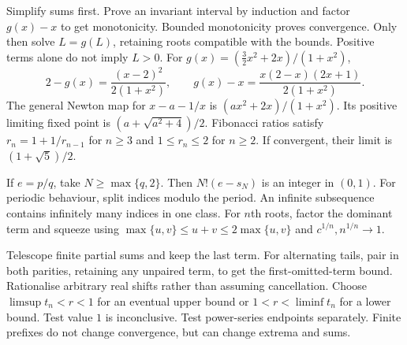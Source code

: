\ifdefined\standaloneformulasheet
\sheetnewtonandquadratic
\fi
{}
Simplify sums first. Prove an invariant interval by induction and
factor $g(x)-x$ to get monotonicity. Bounded monotonicity proves
convergence. Only then solve $L=g(L)$, retaining roots compatible
with the bounds. Positive terms alone do not imply $L>0$.
For $g(x)=(\tfrac32x^2+2x)/(1+x^2)$,
\[
  2-g(x)=\frac{(x-2)^2}{2(1+x^2)},\qquad
  g(x)-x=\frac{x(2-x)(2x+1)}{2(1+x^2)}.
\]
The general Newton map for $x-a-1/x$ is
$(ax^2+2x)/(1+x^2)$. Its positive limiting fixed point is
$(a+\sqrt{a^2+4})/2$.
Fibonacci ratios satisfy $r_n=1+1/r_{n-1}$ for $n\ge3$
and $1\le r_n\le2$ for $n\ge2$.
If convergent, their limit is $(1+\sqrt5)/2$.

If $e=p/q$, take $N\ge\max\{q,2\}$. Then $N!(e-s_N)$ is an integer in $(0,1)$.
For periodic behaviour, split indices modulo the period. An infinite
subsequence contains infinitely many indices in one class.
For $n$th roots, factor the dominant term and squeeze using
$\max\{u,v\}\le u+v\le2\max\{u,v\}$ and $c^{1/n},n^{1/n}\to1$.

Telescope finite partial sums and keep the last term.
For alternating tails, pair in both parities, retaining any unpaired
term, to get the first-omitted-term bound.
Rationalise arbitrary real shifts rather than assuming cancellation.
Choose $\limsup t_n<r<1$ for an eventual upper bound or
$1<r<\liminf t_n$ for a lower bound.
Test value $1$ is inconclusive. Test power-series endpoints separately.
Finite prefixes do not change convergence, but can change extrema and sums.

